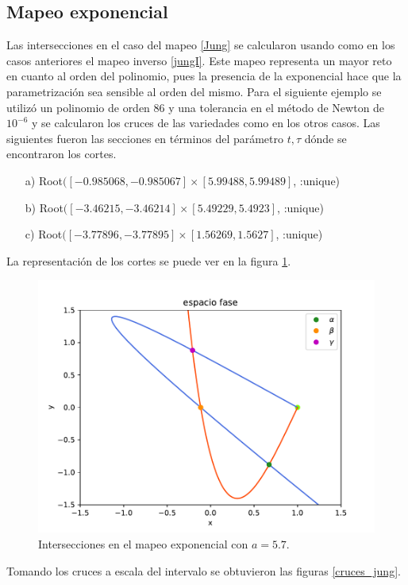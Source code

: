 \subsection{Mapeo exponencial}
Las intersecciones en el caso del mapeo \eqref{Jung} se calcularon usando como en los casos anteriores el mapeo inverso \eqref{jungI}. Este mapeo representa un mayor reto en cuanto al orden del polinomio, pues la presencia de la exponencial hace que la parametrización sea sensible al orden del mismo. Para el siguiente ejemplo se utilizó un polinomio de orden 86 y una tolerancia en el método de Newton de $10^{-6}$ y se calcularon los cruces de las variedades como en los otros casos. Las siguientes fueron las secciones en términos del parámetro $t,\tau$ dónde se encontraron los cortes. 
\begin{itemize}
\item[a)] Root$([-0.985068, -0.985067] \times [5.99488, 5.99489]$, :unique)
\item[b)] Root$([-3.46215, -3.46214] \times [5.49229, 5.4923]$, :unique)
\item[c)] Root$([-3.77896, -3.77895] \times [1.56269, 1.5627]$, :unique)
\end{itemize}
La representación de los cortes se puede ver en la figura \ref{jung_cortes}.
\begin{figure}[H]
\centering
\includegraphics[scale=0.5]{cruces_jung1}
\caption{Intersecciones en el mapeo exponencial con $a=5.7$.}
\label{jung_cortes}
\end{figure}

Tomando los cruces a escala del intervalo se obtuvieron las figuras \ref{cruces_jung}.

